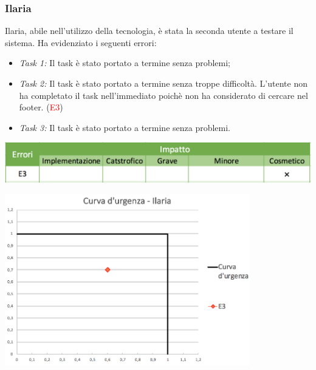\documentclass[12pt,a4paper]{report}
\begin{document}
  \subsubsection{Ilaria}
  Ilaria, abile nell'utilizzo della tecnologia, è stata la seconda utente a testare il sistema. Ha evidenziato i seguenti errori:
  \begin{itemize}
    \item \textit{Task 1:} Il task è stato portato a termine senza problemi;
    \item \textit{Task 2:} Il task è stato portato a termine senza troppe difficoltà. L'utente non ha completato il task nell'immediato poichè non ha considerato di cercare nel footer. (\textcolor{red}{E3})
    \item \textit{Task 3:} Il task è stato portato a termine senza problemi.
  \end{itemize}
  \includegraphics[width=1\textwidth]{"Project Management Sources/ImpattoIlaria"}
  \begin{center}
      \includegraphics[width=0.8\textwidth]{"Project Management Sources/UrgenzaIlaria"}
  \end{center}
\end{document}
